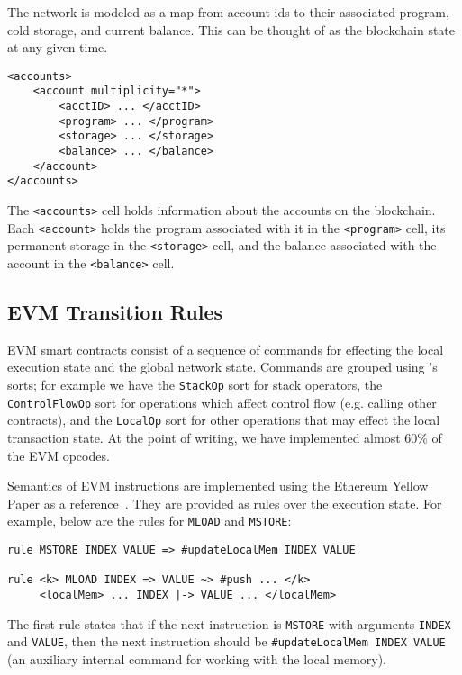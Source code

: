 The network is modeled as a map from account ids to their associated program,
cold storage, and current balance. This can be thought of as the blockchain
state at any given time.

\begin{verbatim}
<accounts>
    <account multiplicity="*">
        <acctID> ... </acctID>
        <program> ... </program>
        <storage> ... </storage>
        <balance> ... </balance>
    </account>
</accounts>
\end{verbatim}

The \texttt{<accounts>} cell holds information about the accounts on the blockchain. Each \texttt{<account>} holds the program associated with it in the
\texttt{<program>} cell, its permanent storage in the \texttt{<storage>} cell,
and the balance associated with the account in the \texttt{<balance>} cell.

\subsection{EVM Transition Rules}

EVM smart contracts consist of a sequence of commands for effecting the local
execution state and the global network state. Commands are grouped using \K{}'s
sorts; for example we have the \texttt{StackOp} sort for stack operators, the
\texttt{ControlFlowOp} sort for operations which affect control flow (e.g.
calling other contracts), and the \texttt{LocalOp} sort for other operations
that may effect the local transaction state. At the point of writing, we have
implemented almost 60\% of the EVM opcodes.

Semantics of EVM instructions are implemented using the Ethereum Yellow Paper as a
reference~\cite{wood2014ethereum}. They are provided as \K{} rules over the
execution state. For example, below are the rules for \texttt{MLOAD} and
\texttt{MSTORE}:

\begin{verbatim}
rule MSTORE INDEX VALUE => #updateLocalMem INDEX VALUE

rule <k> MLOAD INDEX => VALUE ~> #push ... </k>
     <localMem> ... INDEX |-> VALUE ... </localMem>
\end{verbatim}

The first rule states that if the next instruction is \texttt{MSTORE} with arguments
\texttt{INDEX} and \texttt{VALUE}, then the next instruction should be
\texttt{\#updateLocalMem INDEX VALUE} (an auxiliary internal command for working
with the local memory).

